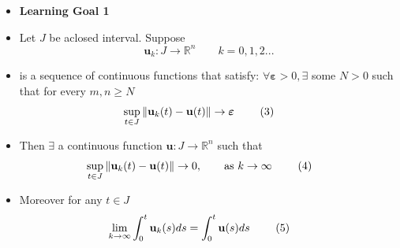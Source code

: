 \documentclass[12pt]{article}
\newenvironment{AndreaBox}[1]{
\begin{tcolorbox}[
    title=#1,
    colback=white,
    colframe=Blue,
    coltitle=white,
    fonttitle=\bfseries,
    colback=white,
    rounded corners,
    boxrule=0.5pt,
    top=1mm, bottom=1mm, left=4mm, right=-2mm, %
    rounded corners,
    boxrule=0.5pt,
] \raggedright
}{\end{tcolorbox}}
\begin{document}
\begin{AndreaBox}{Lemma 2:}
    \begin{itemize}[label={}, leftmargin=1mm, nosep]
        \item {\color{RoyalBlue}\textbf{Learning Goal 1}}
        \item Let $J$ be aclosed interval. Suppose 
        \[ \mathbf{u}_k: J \rightarrow \mathbb{R}^n \quad \quad k=0,1,2...\]
        \item is a sequence of continuous functions that satisfy: $\forall \boldsymbol{\varepsilon} >0, \exists$ some $N > 0$ such that for every $m,n\geq N$
        \[ \sup_{t \in J} \Vert \mathbf{u}_k(t) - \mathbf{u}(t) \Vert \to \boldsymbol{\varepsilon} \tag*{ (3)\makebox[0.5cm]{} }\]
        \item Then $\exists$ a continuous function $\mathbf{u}:J \rightarrow \mathbb{R}^n$ such that
        \[ \sup_{t \in J} \Vert \mathbf{u}_k(t) - \mathbf{u}(t) \Vert \to 0, \quad \quad \text{as } k \to \infty \tag*{ (4)\makebox[0.5cm]{} }\]
        \item Moreover for any $t \in J$
        \[ \lim_{k \to \infty} \int_{0}^{t} \mathbf{u}_k(s) ds = \int_{0}^{t} \mathbf{u}(s) ds \tag*{ (5)\makebox[0.5cm]{} } \]
        
        

    \end{itemize}
\end{AndreaBox}
\end{document}
